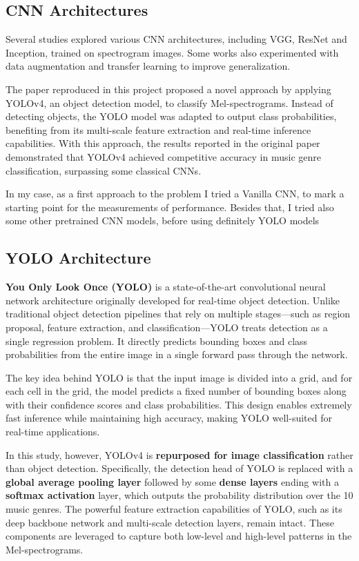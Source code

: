 \documentclass[a4paper,12pt]{article}
\begin{document}
\subsection{CNN Architectures}
Several studies explored various CNN architectures, including VGG, ResNet and Inception, trained on spectrogram images. Some works also experimented with data augmentation and transfer learning to improve generalization.

The paper reproduced in this project proposed a novel approach by applying YOLOv4, an object detection model, to classify Mel-spectrograms. Instead of detecting objects, the YOLO model was adapted to output class probabilities, benefiting from its multi-scale feature extraction and real-time inference capabilities. 
With this approach, the results reported in the original paper demonstrated that YOLOv4 achieved competitive accuracy in music genre classification, surpassing some classical CNNs.

In my case, as a first approach to the problem I tried a Vanilla CNN, to mark a starting point for the measurements of performance. Besides that, I tried also some other pretrained CNN models, before using definitely YOLO models 



\subsection{YOLO Architecture}

\textbf{You Only Look Once (YOLO)} is a state-of-the-art convolutional neural network architecture originally developed for real-time object detection. Unlike traditional object detection pipelines that rely on multiple stages—such as region proposal, feature extraction, and classification—YOLO treats detection as a single regression problem. It directly predicts bounding boxes and class probabilities from the entire image in a single forward pass through the network.

The key idea behind YOLO is that the input image is divided into a grid, and for each cell in the grid, the model predicts a fixed number of bounding boxes along with their confidence scores and class probabilities. This design enables extremely fast inference while maintaining high accuracy, making YOLO well-suited for real-time applications.

In this study, however, YOLOv4 is \textbf{repurposed for image classification} rather than object detection. Specifically, the detection head of YOLO is replaced with a \textbf{global average pooling layer} followed by some \textbf{dense layers} ending with a \textbf{softmax activation} layer, which outputs the probability distribution over the 10 music genres. The powerful feature extraction capabilities of YOLO, such as its deep backbone network and multi-scale detection layers, remain intact. These components are leveraged to capture both low-level and high-level patterns in the Mel-spectrograms.
\end{document}
